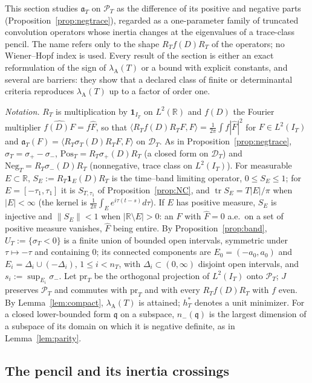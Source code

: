 \documentclass[11pt]{amsart}
\theoremstyle{definition}
\theoremstyle{remark}
\newcommand{\R}{\mathbb R}
\newcommand{\PT}{\mathcal P_T}
\newcommand{\IT}{I_T}
\newcommand{\lamA}{\lambda_{\mathrm A}(T)}
\newcommand{\sT}{\sigma_T}
\newcommand{\Fh}{\widehat F}
\begin{document}
This section studies $\mathfrak a_T$ on $\PT$ as the difference of its positive and negative parts
(Proposition~\ref{prop:negtrace}), regarded as a one-parameter family of truncated convolution operators
whose inertia changes at the eigenvalues of a trace-class pencil. The name refers only to the shape
$R_Tf(D)R_T$ of the operators; no Wiener--Hopf index is used. Every result of the section is either an exact
reformulation of the sign of $\lamA$ or a bound with explicit constants, and several are barriers: they show
that a declared class of finite or determinantal criteria reproduces $\lamA$ up to a factor of order one.

\emph{Notation.} $R_T$ is multiplication by $\mathbf 1_{\IT}$ on $L^2(\R)$ and $f(D)$ the Fourier multiplier
$\widehat{f(D)F}=f\Fh$, so that $\langle R_Tf(D)R_TF,F\rangle=\frac1{2\pi}\int f|\Fh|^2$ for $F\in L^2(\IT)$ and
$\mathfrak a_T(F)=\langle R_T\sT(D)R_TF,F\rangle$ on $\mathcal D_T$. As in Proposition~\ref{prop:negtrace},
$\sT=\sigma_+-\sigma_-$, $\mathrm{Pos}_T=R_T\sigma_+(D)R_T$ (a closed form on $\mathcal D_T$) and
$\mathrm{Neg}_T=R_T\sigma_-(D)R_T$ (nonnegative, trace class on $L^2(\IT)$). For measurable $E\subset\R$,
$S_E:=R_T\mathbf 1_E(D)R_T$ is the time--band limiting operator, $0\le S_E\le1$; for $E=[-\tau_1,\tau_1]$ it is
$S_{T,\tau_1}$ of Proposition~\ref{prop:NC}, and $\operatorname{tr}S_E=T|E|/\pi$ when $|E|<\infty$ (the kernel is
$\frac1{2\pi}\int_Ee^{i\tau(t-s)}d\tau$). If $E$ has positive measure, $S_E$ is injective and $\|S_E\|<1$ when
$|\R\setminus E|>0$: an $F$ with $\Fh=0$ a.e.\ on a set of positive measure vanishes, $\Fh$ being entire. By
Proposition~\ref{prop:band}, $U_T:=\{\sT<0\}$ is a finite union of bounded open intervals, symmetric under
$\tau\mapsto-\tau$ and containing $0$; its connected components are $E_0=(-a_0,a_0)$ and
$E_i=\Delta_i\cup(-\Delta_i)$, $1\le i<n_T$, with $\Delta_i\subset(0,\infty)$ disjoint open intervals, and
$s_i:=\sup_{E_i}\sigma_-$. Let $\mathrm{pr}_T$ be the orthogonal projection of $L^2(\IT)$ onto $\PT$; $J$
preserves $\PT$ and commutes with $\mathrm{pr}_T$ and with every $R_Tf(D)R_T$ with $f$ even. By
Lemma~\ref{lem:compact}, $\lamA$ is attained; $h^*_T$ denotes a unit minimizer. For a closed lower-bounded form
$\mathfrak q$ on a subspace, $n_-(\mathfrak q)$ is the largest dimension of a subspace of its domain on which it
is negative definite, as in Lemma~\ref{lem:parity}.

\subsection{The pencil and its inertia crossings}\label{subsec:wh-pencil}
\end{document}
